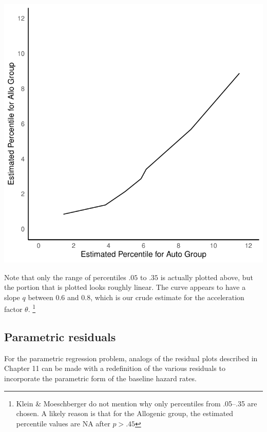 \documentclass[10pt]{article}\usepackage[]{graphicx}\usepackage[]{xcolor}
\makeatletter
\def\maxwidth{ %
  \ifdim\Gin@nat@width>\linewidth
    \linewidth
  \else
    \Gin@nat@width
  \fi
}
\newenvironment{knitrout}{}{} %
\theoremstyle{definition}
\numberwithin{equation}{subsection}
\numberwithin{figure}{section}
\numberwithin{table}{subsection}
\numberwithin{Report}{section}
\numberwithin{Example}{subsection}
\makeatother
\begin{document}
\begin{knitrout}
\color{fgcolor}

{\centering \includegraphics[width=\maxwidth]{figure/unnamed-chunk-2-1} 

}


\end{knitrout}


\noindent Note that only the range of percentiles $.05$ to $.35$ is actually plotted above, but the portion that is plotted looks roughly linear.
The curve appears to have a slope $q$ between $0.6$ and $0.8$, which is our crude estimate for the acceleration factor $\theta$.
\footnote{Klein \& Moeschberger do not mention why only percentiles from .05--.35 are chosen. A likely reason is that for the Allogenic group, the estimated percentile values are NA after $p > .45$}

\newpage

\subsection{Parametric residuals}

For the parametric regression problem, analogs of the residual plots described in Chapter 11 can be made with a redefinition of the various residuals to incorporate the parametric form of the baseline hazard rates.
\end{document}
